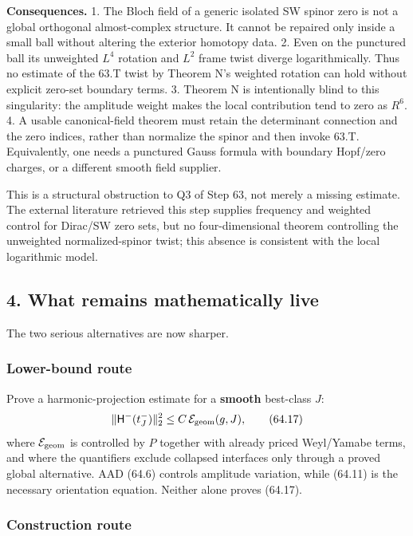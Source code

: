 \documentclass[
  10pt,
]{report}
\begin{document}
\textbf{Consequences.} 1. The Bloch field of a generic isolated SW
spinor zero is not a global orthogonal almost-complex structure. It
cannot be repaired only inside a small ball without altering the
exterior homotopy data. 2. Even on the punctured ball its unweighted
\(L^4\) rotation and \(L^2\) frame twist diverge logarithmically. Thus
no estimate of the 63.T twist by Theorem N's weighted rotation can hold
without explicit zero-set boundary terms. 3. Theorem N is intentionally
blind to this singularity: the amplitude weight makes the local
contribution tend to zero as \(R^6\). 4. A usable canonical-field
theorem must retain the determinant connection and the zero indices,
rather than normalize the spinor and then invoke 63.T. Equivalently, one
needs a punctured Gauss formula with boundary Hopf/zero charges, or a
different smooth field supplier.

This is a structural obstruction to Q3 of Step 63, not merely a missing
estimate. The external literature retrieved this step supplies frequency
and weighted control for Dirac/SW zero sets, but no four-dimensional
theorem controlling the unweighted normalized-spinor twist; this absence
is consistent with the local logarithmic model.

\hypertarget{what-remains-mathematically-live}{%
\subsection{4. What remains mathematically
live}\label{what-remains-mathematically-live}}

The two serious alternatives are now sharper.

\hypertarget{lower-bound-route}{%
\subsubsection{Lower-bound route}\label{lower-bound-route}}

Prove a harmonic-projection estimate for a \textbf{smooth} best-class
\(J\): \[
 \|\mathsf H^-(t_J^-)\|_2^2
 \le C\,\mathcal E_{\rm geom}(g,J),
\tag{64.17}
\] where \(\mathcal E_{\rm geom}\) is controlled by \(P\) together with
already priced Weyl/Yamabe terms, and where the quantifiers exclude
collapsed interfaces only through a proved global alternative. AAD
(64.6) controls amplitude variation, while (64.11) is the necessary
orientation equation. Neither alone proves (64.17).

\hypertarget{construction-route}{%
\subsubsection{Construction route}\label{construction-route}}
\end{document}
